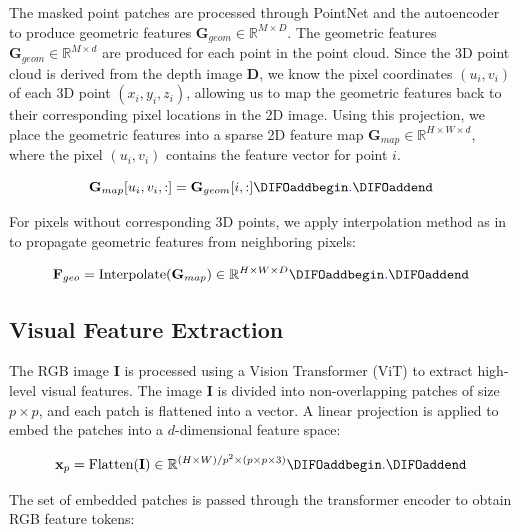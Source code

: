\noindent The masked point patches are processed through PointNet \cite{qi2017pointnet} and the autoencoder to produce geometric features $\mathbf{G}_{geom} \in \mathbb{R}^{M \times D}$. The geometric features $\mathbf{G}_{geom} \in \mathbb{R}^{M \times d}$ are produced for each point in the point cloud. Since the 3D point cloud is derived from the depth image $\mathbf{D}$, we know the pixel coordinates $(u_i, v_i)$ of each 3D point $(x_i, y_i, z_i)$, allowing us to map the geometric features back to their corresponding pixel locations in the 2D image. Using this projection, we place the geometric features into a sparse 2D feature map $\mathbf{G}_{map} \in \mathbb{R}^{H \times W \times d}$, where the pixel $(u_i, v_i)$ contains the feature vector for point $i$.

\begin{equation}
\mathbf{G}_{map}[u_i, v_i, :] = \mathbf{G}_{geom}[i, :]\DIFaddbegin \DIFadd{.
}\DIFaddend \end{equation}

\noindent For pixels without corresponding 3D points, we apply interpolation method as in \cite{wang2023multimodal} to propagate geometric features from neighboring pixels:

\begin{equation}
    \mathbf{F}_{geo} = \text{Interpolate}(\mathbf{G}_{map}) \in \mathbb{R}^{H \times W \times D}\DIFaddbegin \DIFadd{.
}\DIFaddend \end{equation}

\subsection*{Visual Feature Extraction}

The RGB image $\mathbf{I}$ is processed using a Vision Transformer (ViT) \cite{dosovitskiy2020image} to extract high-level visual features. The image $\mathbf{I}$ is divided into non-overlapping patches of size $p \times p$, and each patch is flattened into a vector. A linear projection is applied to embed the patches into a $d$-dimensional feature space:

\begin{equation}
    \mathbf{x}_p = \text{Flatten}(\mathbf{I}) \in \mathbb{R}^{(H \times W) / p^2 \times (p \times p \times 3)}\DIFaddbegin \DIFadd{.
}\DIFaddend \end{equation}

\noindent The set of embedded patches is passed through the transformer encoder to obtain RGB feature tokens:

